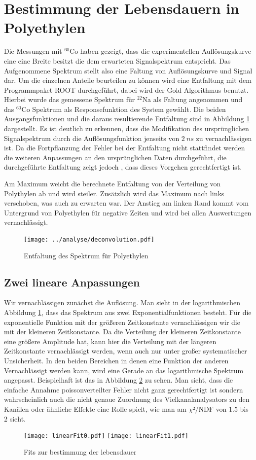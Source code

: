 \documentclass[a4paper,12pt]{article}
\begin{document}
\section{Bestimmung der Lebensdauern in Polyethylen}
Die Messungen mit $^{60}$Co haben gezeigt, dass die experimentellen Auflösungskurve eine eine Breite besitzt die dem erwarteten Signalspektrum entspricht. Das Aufgenommene Spektrum
stellt also eine Faltung von Auflösungskurve und Signal dar. Um die einzelnen Anteile beurteilen zu können wird eine Entfaltung mit dem Programmpaket ROOT durchgeführt, dabei wird
der Gold Algorithmus \cite{gold_algo} benutzt. Hierbei wurde das gemessene Spektrum für $^{22}$Na als Faltung angenommen und das $^{60}$Co Spektrum als Responsefunktion des System
gewählt. Die beiden Ausgangsfunktionen und die daraus resultierende Entfaltung sind in Abbildung \ref{fig:deconvolution} dargestellt. Es ist deutlich zu erkennen, dass die
Modifikation des ursprünglichen Signalspektrum durch die Auflösungsfunktion jenseits von $\SI{2}{ns}$ zu vernachlässigen ist. Da die Fortpflanzung der Fehler bei
der Entfaltung nicht stattfindet werden die weiteren Anpassungen an den ursprünglichen Daten durchgeführt, die durchgeführte Entfaltung zeigt jedoch
, dass dieses Vorgehen gerechtfertigt ist.

Am Maximum weicht die berechnete Entfaltung von der Verteilung von Polythylen ab und wird steiler.
Zusätzlich wird das Maximum nach links verschoben, was auch zu erwarten war.
Der Anstieg am linken Rand kommt vom Untergrund von Polyethylen für negative Zeiten und wird bei allen Auswertungen vernachlässigt.


\begin{figure}
	\texttt{[image: ../analyse/deconvolution.pdf]}
	\caption{Entfaltung des Spektrum für Polyethylen}
	\label{fig:deconvolution}
\end{figure}
\subsection{Zwei lineare Anpassungen}
Wir vernachlässigen zunächst die Auflösung.
Man sieht in der logarithmischen Abbildung \ref{fig:deconvolution}, dass das Spektrum aus zwei Exponentialfunktionen
besteht. Für die exponentielle Funktion mit der größeren Zeitkonstante vernachlässigen wir die mit
der kleineren Zeitkonstante. Da die Verteilung der kleineren Zeitkonstante eine größere Amplitude
hat, kann hier die Verteilung mit der längeren Zeitkonstante vernachlässigt werden, wenn auch nur
unter großer systematischer Unsicherheit. In den beiden Bereichen in denen eine Funktion der anderen
Vernachlässigt werden kann, wird eine Gerade an das logarithmische Spektrum angepasst. Beispielhaft
ist das in Abbildung \ref{fig:dualLinearFit} zu sehen. Man sieht, dass die einfache Annahme
poissonverteilter Fehler nicht ganz gerechtfertigt ist sondern wahrscheinlich auch die nicht genaue
Zuordnung des Vielkanalanalysators zu den Kanälen oder ähnliche Effekte eine Rolle spielt, wie man
am $χ²/\text{NDF}$ von $1.5$ bis $2$ sieht.
\begin{figure}
	\texttt{[image: linearFit0.pdf]}
	\texttt{[image: linearFit1.pdf]}
	\caption{Fits zur bestimmung der lebensdauer}
	\label{fig:dualLinearFit}
\end{figure}
\end{document}
